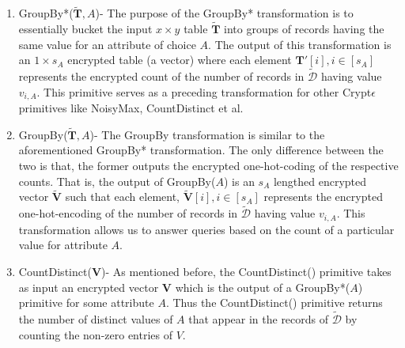 \begin{enumerate}
    \item{\textsf{GroupBy*}($\mathbf{\tilde{T}},A$)}- The purpose of the \textsf{GroupBy*} transformation is to essentially bucket the input $x\times y$ table $\mathbf{\tilde{T}}$ into groups of records having the same value for an attribute of choice $A$. The output of this transformation is an $1\times s_A$ encrypted table (a vector)  where each element $\mathbf{T'}[i], i \in [s_A]$ represents the encrypted count of the number of records in $\boldsymbol{\tilde{\mathcal{D}}}$ having value $v_{i,A}$.
    This primitive serves as a preceding transformation for other Crypt$\epsilon$ primitives like \textsf{NoisyMax}, \textsf{CountDistinct} et al.
     \item{\textsf{GroupBy}($\mathbf{\tilde{T}},A$)-} The \textsf{GroupBy} transformation is similar to the aforementioned \textsf{GroupBy*} transformation. The only difference between the two is that, the former outputs the encrypted one-hot-coding of the respective counts. That is, the output of \textsf{GroupBy}($A$)  is an $s_A$ lengthed encrypted vector $\tilde{\mathbf{V}}$ such that each element, $\tilde{\mathbf{V}}[i], i \in [s_A]$ represents the encrypted one-hot-encoding of the number of records in $\boldsymbol{\tilde{\mathcal{D}}}$ having value $v_{i,A}$. This transformation allows us to answer queries based on the count of a particular value for attribute $A$.
     \item {\textsf{CountDistinct}($\mathbf{V}$)-} As mentioned before, the \textsf{CountDistinct()} primitive takes as input an encrypted vector $\mathbf{V}$ which is the output of a \textsf{GroupBy*}($A$) primitive for some attribute $A$. Thus the \textsf{CountDistinct}() primitive  returns the number of distinct values of $A$ that appear in the records of $\boldsymbol{\tilde{\mathcal{D}}}$ by counting the non-zero entries of $V$.  
\end{enumerate}
